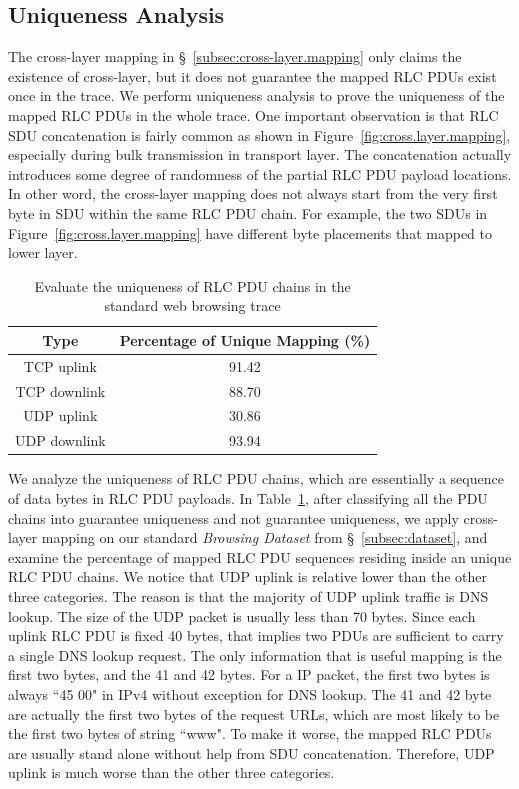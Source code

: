 \subsection{Uniqueness Analysis}
\label{subsec:uniqueness.analysis}
The cross-layer mapping in \S~\ref{subsec:cross-layer.mapping} only claims the existence of cross-layer, but it does not guarantee the mapped RLC PDUs exist once in the trace. We perform uniqueness analysis to prove the uniqueness of the mapped RLC PDUs in the whole trace. One important observation is that RLC SDU concatenation is fairly common as shown in Figure~\ref{fig:cross.layer.mapping}, especially during bulk transmission in transport layer. The concatenation actually introduces some degree of randomness of the partial RLC PDU payload locations. In other word, the cross-layer mapping does not always start from the very first byte in SDU within the same RLC PDU chain. For example, the two SDUs in Figure~\ref{fig:cross.layer.mapping} have different byte placements that mapped to lower layer. 

\begin{table}[t!]
\begin{tabularx}{0.48\textwidth}{ | c | X | }
	\hline
  	\textbf{Type} & \textbf{Percentage of Unique Mapping (\%)} \\
  	\hline\hline
  	TCP uplink & \multicolumn{1}{|c|}{91.42} \\
  	\hline
  	TCP downlink & \multicolumn{1}{|c|}{88.70} \\
  	\hline
  	UDP uplink & \multicolumn{1}{|c|}{30.86} \\
  	\hline
  	UDP downlink & \multicolumn{1}{|c|}{93.94} \\
  	\hline
\end{tabularx}
\caption{Evaluate the uniqueness of RLC PDU chains in the standard web browsing trace}
\label{tab:uniqueness.analysis}
\end{table}

We analyze the uniqueness of RLC PDU chains, which are essentially a sequence of data bytes in RLC PDU payloads. In Table~\ref{tab:uniqueness.analysis}, after classifying all the PDU chains into guarantee uniqueness and not guarantee uniqueness, we apply cross-layer mapping on our standard \emph{Browsing Dataset} from \S~\ref{subsec:dataset}, and examine the percentage of mapped RLC PDU sequences residing inside an unique RLC PDU chains. We notice that UDP uplink is relative lower than the other three categories. The reason is that the majority of UDP uplink traffic is DNS lookup. The size of the UDP packet is usually less than 70 bytes. Since each uplink RLC PDU is fixed 40 bytes, that implies two PDUs are sufficient to carry a single DNS lookup request. The only information that is useful mapping is the first two bytes, and the 41 and 42 bytes. For a IP packet, the first two bytes is always ``45 00" in IPv4 without exception for DNS lookup. The 41 and 42 byte are actually the first two bytes of the request URLs, which are most likely to be the first two bytes of string ``www". To make it worse, the mapped RLC PDUs are usually stand alone without help from SDU concatenation. Therefore, UDP uplink is much worse than the other three categories.

